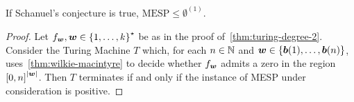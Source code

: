 \begin{theorem}
\label{thm:turing-degree-1}
If Schanuel's conjecture is true, $\mbox{MESP} \leq \emptyset^{(1)}$.
\end{theorem}

\begin{proof}
Let $f_{\boldsymbol{w}}, \boldsymbol{w} \in {\lbrace 1, \ldots, k \rbrace}^{\star}$ be as in the proof of~\cref{thm:turing-degree-2}.
Consider the Turing Machine $T$ which, for each $n \in \mathbb{N}$ and $\boldsymbol{w} \in \lbrace \boldsymbol{b}(1), \ldots, \boldsymbol{b}(n) \rbrace$, uses~\cref{thm:wilkie-macintyre} to decide whether $f_{\boldsymbol{w}}$ admits a zero in the region ${[0,n]}^{\lvert \boldsymbol{w} \rvert}$.
Then $T$ terminates if and only if the instance of MESP under consideration is positive.
\end{proof}
